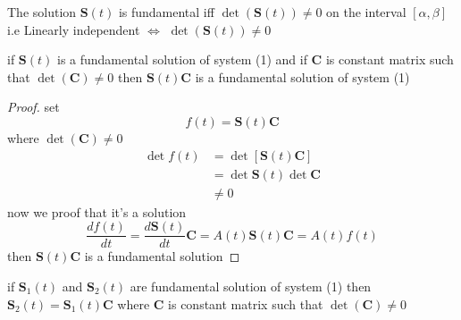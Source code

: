 \documentclass[]{article}
\begin{document}
\begin{theorem}[]
        The solution $\mathbf{S}(t)$ is fundamental iff $\det(\mathbf{S}(t))\neq 0$ on the interval $[\alpha , \beta]$
        \\
        i.e Linearly independent $\Longleftrightarrow$ $\det(\mathbf{S}(t))\neq 0$
\end{theorem}

\begin{theorem}[]
    if $\mathbf{S}(t)$ is a fundamental solution of system (1) and if $\mathbf{C}$ is constant matrix such that $\det(\mathbf{C})\neq 0$ then $\mathbf{S}(t)\mathbf{C}$ is a fundamental
    solution of system (1) 
\end{theorem}
\begin{proof}[Proof]
    set
    \[
       f(t) = \mathbf{S}(t)\mathbf{C}
    \]
    where $\det(\mathbf{C})\neq 0$
    \begin{align*}
        \det f(t) &= \det[\mathbf{S}(t)\mathbf{C}]
        \\
                        &= \det\mathbf{S}(t)\det\mathbf{C}
        \\
                        &\neq 0
    \end{align*}
    now we proof that it's a solution
    \[
        \frac{df(t)}{dt} = \frac{d\mathbf{S}(t)}{dt}\mathbf{C} =A(t)\mathbf{S}(t)\mathbf{C} = A(t)f(t)
    \]
    then $\mathbf{S}(t)\mathbf{C}$ is a fundamental solution
\end{proof}
\newpage
\begin{theorem}[]
    if $\mathbf{S}_1(t)$ and $\mathbf{S}_2(t)$ are fundamental solution of system (1) then $\mathbf{S}_2(t) = \mathbf{S}_1(t)\mathbf{C}$ where $\mathbf{C}$ is constant matrix such that $\det(\mathbf{C})\neq 0$
\end{theorem}
\end{document}
